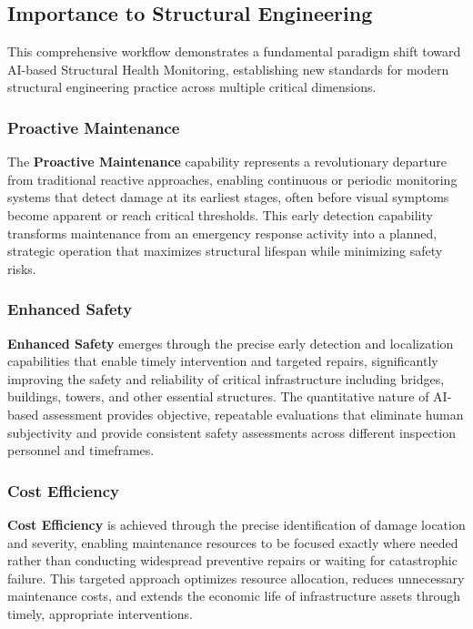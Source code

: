 \documentclass[11pt,a4paper]{article}
\begin{document}
\subsection{Importance to Structural Engineering}

This comprehensive workflow demonstrates a fundamental paradigm shift toward AI-based Structural Health Monitoring, establishing new standards for modern structural engineering practice across multiple critical dimensions.

\subsubsection{Proactive Maintenance}

The \textbf{Proactive Maintenance} capability represents a revolutionary departure from traditional reactive approaches, enabling continuous or periodic monitoring systems that detect damage at its earliest stages, often before visual symptoms become apparent or reach critical thresholds. This early detection capability transforms maintenance from an emergency response activity into a planned, strategic operation that maximizes structural lifespan while minimizing safety risks.

\subsubsection{Enhanced Safety}

\textbf{Enhanced Safety} emerges through the precise early detection and localization capabilities that enable timely intervention and targeted repairs, significantly improving the safety and reliability of critical infrastructure including bridges, buildings, towers, and other essential structures. The quantitative nature of AI-based assessment provides objective, repeatable evaluations that eliminate human subjectivity and provide consistent safety assessments across different inspection personnel and timeframes.

\subsubsection{Cost Efficiency}

\textbf{Cost Efficiency} is achieved through the precise identification of damage location and severity, enabling maintenance resources to be focused exactly where needed rather than conducting widespread preventive repairs or waiting for catastrophic failure. This targeted approach optimizes resource allocation, reduces unnecessary maintenance costs, and extends the economic life of infrastructure assets through timely, appropriate interventions.
\end{document}
